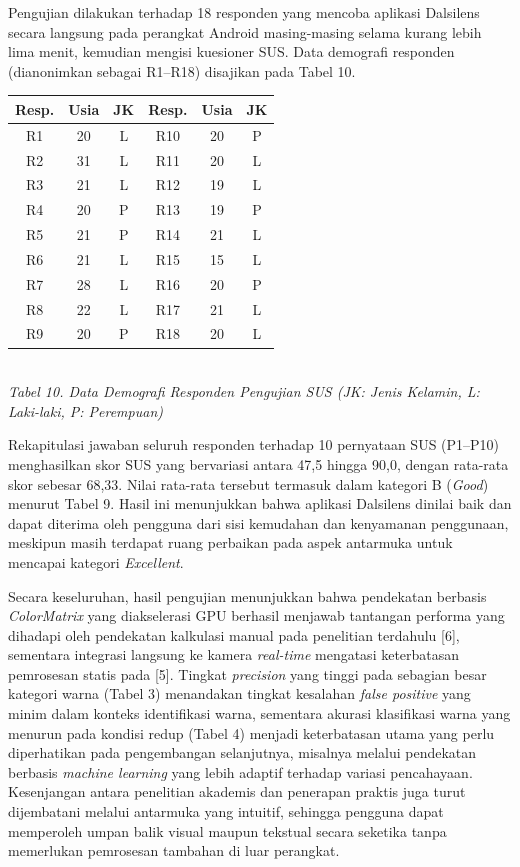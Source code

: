Pengujian dilakukan terhadap 18 responden yang mencoba aplikasi Dalsilens secara langsung pada perangkat Android masing-masing selama kurang lebih lima menit, kemudian mengisi kuesioner SUS. Data demografi responden (dianonimkan sebagai R1--R18) disajikan pada Tabel 10.

\begin{table}[H]
  \centering
  {\footnotesize
  \begin{tabular}{|c|c|c||c|c|c|}
    \hline
    \textbf{Resp.} & \textbf{Usia} & \textbf{JK} & \textbf{Resp.} & \textbf{Usia} & \textbf{JK} \\
    \hline
    R1  & 20 & L & R10 & 20 & P \\ \hline
    R2  & 31 & L & R11 & 20 & L \\ \hline
    R3  & 21 & L & R12 & 19 & L \\ \hline
    R4  & 20 & P & R13 & 19 & P \\ \hline
    R5  & 21 & P & R14 & 21 & L \\ \hline
    R6  & 21 & L & R15 & 15 & L \\ \hline
    R7  & 28 & L & R16 & 20 & P \\ \hline
    R8  & 22 & L & R17 & 21 & L \\ \hline
    R9  & 20 & P & R18 & 20 & L \\ \hline
  \end{tabular}}\\[0.3em]
  {\footnotesize\textit{Tabel 10. Data Demografi Responden Pengujian SUS (JK: Jenis Kelamin, L: Laki-laki, P: Perempuan)}}
\end{table}

Rekapitulasi jawaban seluruh responden terhadap 10 pernyataan SUS (P1--P10) menghasilkan skor SUS yang bervariasi antara 47,5 hingga 90,0, dengan rata-rata skor sebesar 68,33. Nilai rata-rata tersebut termasuk dalam kategori B (\textit{Good}) menurut Tabel 9. Hasil ini menunjukkan bahwa aplikasi Dalsilens dinilai baik dan dapat diterima oleh pengguna dari sisi kemudahan dan kenyamanan penggunaan, meskipun masih terdapat ruang perbaikan pada aspek antarmuka untuk mencapai kategori \textit{Excellent}.

Secara keseluruhan, hasil pengujian menunjukkan bahwa pendekatan berbasis \textit{ColorMatrix} yang diakselerasi GPU berhasil menjawab tantangan performa yang dihadapi oleh pendekatan kalkulasi manual pada penelitian terdahulu [6], sementara integrasi langsung ke kamera \textit{real-time} mengatasi keterbatasan pemrosesan statis pada [5]. Tingkat \textit{precision} yang tinggi pada sebagian besar kategori warna (Tabel 3) menandakan tingkat kesalahan \textit{false positive} yang minim dalam konteks identifikasi warna, sementara akurasi klasifikasi warna yang menurun pada kondisi redup (Tabel 4) menjadi keterbatasan utama yang perlu diperhatikan pada pengembangan selanjutnya, misalnya melalui pendekatan berbasis \textit{machine learning} yang lebih adaptif terhadap variasi pencahayaan. Kesenjangan antara penelitian akademis dan penerapan praktis juga turut dijembatani melalui antarmuka yang intuitif, sehingga pengguna dapat memperoleh umpan balik visual maupun tekstual secara seketika tanpa memerlukan pemrosesan tambahan di luar perangkat.

